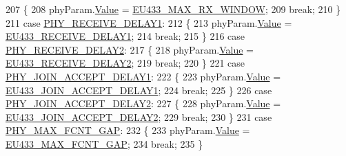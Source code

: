 \begin{DoxyCode}
207         \{
208             phyParam.\mbox{\hyperlink{unionu_phy_param_a8e0dcce3428a8051614e852b8836d0d1}{Value}} = \mbox{\hyperlink{group___r_e_g_i_o_n_e_u433_ga2ea8a5b5b652197dc7f9ad1de0bd199b}{EU433\_MAX\_RX\_WINDOW}};
209             \textcolor{keywordflow}{break};
210         \}
211         \textcolor{keywordflow}{case} \mbox{\hyperlink{group___r_e_g_i_o_n_gga51cbe8f5433d914fe9cf81b451de2c2da3680d45f45e3e0a96ce9f1e1b5ed7371}{PHY\_RECEIVE\_DELAY1}}:
212         \{
213             phyParam.\mbox{\hyperlink{unionu_phy_param_a8e0dcce3428a8051614e852b8836d0d1}{Value}} = \mbox{\hyperlink{group___r_e_g_i_o_n_e_u433_ga5280859658cfa8062200badd1c1cd469}{EU433\_RECEIVE\_DELAY1}};
214             \textcolor{keywordflow}{break};
215         \}
216         \textcolor{keywordflow}{case} \mbox{\hyperlink{group___r_e_g_i_o_n_gga51cbe8f5433d914fe9cf81b451de2c2da9c7e3df5f55fab406960a9e5bf635155}{PHY\_RECEIVE\_DELAY2}}:
217         \{
218             phyParam.\mbox{\hyperlink{unionu_phy_param_a8e0dcce3428a8051614e852b8836d0d1}{Value}} = \mbox{\hyperlink{group___r_e_g_i_o_n_e_u433_ga305aa391ec1a9a008789076ebe87836d}{EU433\_RECEIVE\_DELAY2}};
219             \textcolor{keywordflow}{break};
220         \}
221         \textcolor{keywordflow}{case} \mbox{\hyperlink{group___r_e_g_i_o_n_gga51cbe8f5433d914fe9cf81b451de2c2daf564c82ebd72dcd6c4fc1e702b2ec64c}{PHY\_JOIN\_ACCEPT\_DELAY1}}:
222         \{
223             phyParam.\mbox{\hyperlink{unionu_phy_param_a8e0dcce3428a8051614e852b8836d0d1}{Value}} = \mbox{\hyperlink{group___r_e_g_i_o_n_e_u433_ga88e1bced3e9f82375d0c5918c5bdeb62}{EU433\_JOIN\_ACCEPT\_DELAY1}};
224             \textcolor{keywordflow}{break};
225         \}
226         \textcolor{keywordflow}{case} \mbox{\hyperlink{group___r_e_g_i_o_n_gga51cbe8f5433d914fe9cf81b451de2c2da04e6c3d25ce44a74c0a29f28aa92eb48}{PHY\_JOIN\_ACCEPT\_DELAY2}}:
227         \{
228             phyParam.\mbox{\hyperlink{unionu_phy_param_a8e0dcce3428a8051614e852b8836d0d1}{Value}} = \mbox{\hyperlink{group___r_e_g_i_o_n_e_u433_gab60dc1143d458c07ef3260a944ba0a7d}{EU433\_JOIN\_ACCEPT\_DELAY2}};
229             \textcolor{keywordflow}{break};
230         \}
231         \textcolor{keywordflow}{case} \mbox{\hyperlink{group___r_e_g_i_o_n_gga51cbe8f5433d914fe9cf81b451de2c2da01c12b14686172b4a3c4d095deef4248}{PHY\_MAX\_FCNT\_GAP}}:
232         \{
233             phyParam.\mbox{\hyperlink{unionu_phy_param_a8e0dcce3428a8051614e852b8836d0d1}{Value}} = \mbox{\hyperlink{group___r_e_g_i_o_n_e_u433_ga5b7094c08ac59b66204c07232e25671f}{EU433\_MAX\_FCNT\_GAP}};
234             \textcolor{keywordflow}{break};
235         \}

\end{DoxyCode}
